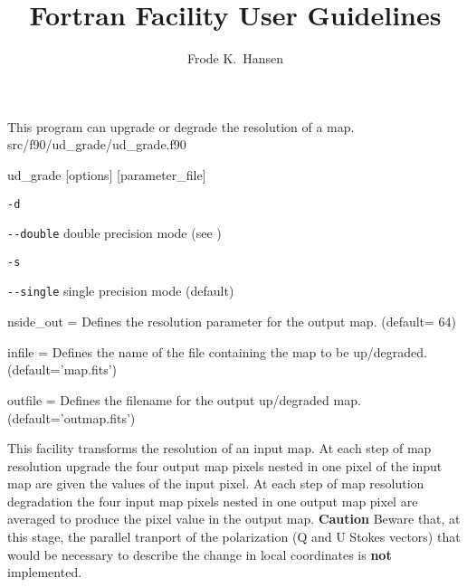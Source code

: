 
\sloppy


\title{\healpix Fortran Facility User Guidelines}
 \section[ud\_grade]{\nosectionname}
\label{fac:ud_grade}
\author{Frode K.~Hansen}

\begin{facility}
{This program can upgrade or degrade the resolution of a \healpix map.} 
{src/f90/ud\_grade/ud\_grade.f90}
\end{facility}

\begin{f90facility}
{ud\_grade [options] [parameter\_file]}
\end{f90facility}

\begin{options}
  \begin{optionlistwide}{} %
    \item[{\tt -d}]
    \item[{\tt -}{\tt -}{\tt double}] double precision mode (see 
)
    \item[{\tt -s}]
    \item[{\tt -}{\tt -}{\tt single}] single precision mode (default)
  \end{optionlistwide}
\end{options}

\begin{qualifiers}
  \begin{qulist}{} %
    \item[{nside\_out = }]%
 Defines the resolution parameter for the output map. 
	(default= 64)
\item[{infile = }]%
 Defines the name of the file containing the map to be 
up/degraded.
(default='map.fits')
\item[{outfile = }]%
 Defines the filename for the output up/degraded map.
(default='outmap.fits')
  \end{qulist}
\end{qualifiers}

\begin{codedescription}
{
This facility transforms the resolution of an input \healpix map.
At each step of map resolution upgrade the four output map pixels nested 
in  one pixel of 
the input map are given  the values of the input pixel. 
At each step of map resolution degradation
the four input map pixels nested in one output map pixel
are averaged to produce the pixel
value in the output map.
{\bf Caution} Beware that, at this stage, the parallel tranport of the polarization
(Q and U Stokes vectors) that would be necessary to describe the change
in local coordinates is {\bf not} implemented.
}
\end{codedescription}

